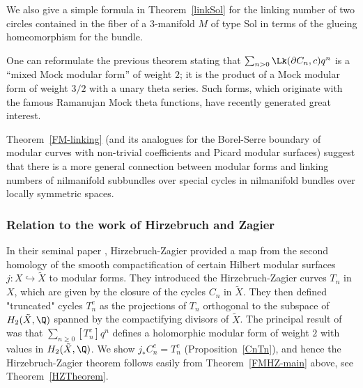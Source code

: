 We also give a simple formula in Theorem~\ref{linkSol} for the
linking number of two circles contained in the fiber of a $3$-manifold
$M$ of type Sol in terms of the glueing homeomorphism for the bundle.

One can reformulate the previous theorem stating that
$\sum_{n>0}\Lk(\partial C_n,c) q^n$ is a ``mixed Mock modular form''
of weight $2$; it is the product of a Mock modular form of weight
$3/2$ with a unary theta series. Such forms, which originate with
the famous Ramanujan Mock theta functions, have recently generated
great interest.

Theorem~\ref{FM-linking} (and its analogues for the Borel-Serre
boundary of modular curves with non-trivial coefficients and Picard
modular surfaces) suggest that there is a more general connection
between modular forms and linking numbers of nilmanifold subbundles
over special cycles in nilmanifold  bundles over locally symmetric
spaces.



\subsubsection*{Relation to the work of Hirzebruch and Zagier}

In their seminal paper \cite{HZ}, Hirzebruch-Zagier provided a map
from the second homology of the smooth compactification of certain
Hilbert modular surfaces $j:X \hookrightarrow \tilde{X}$ to modular
forms. They introduced the Hirzebruch-Zagier curves $T_n$ in $X$,
which are given by the closure of the cycles $C_n$ in $\tilde{X}$.
They then defined "truncated" cycles $T_n^c$ as the
projections of $T_n$ orthogonal to the subspace of $H_2(\tilde{X},\Q)$
spanned by the
compactifying divisors of $\tilde{X}$. The principal result of
\cite{HZ} was that $\sum_{n \geq 0} [T_n^c] q^n$ defines a holomorphic
modular form of weight $2$ with values in $H_2(\tilde{X},\Q)$.
We show $j_{\ast} C_n^c = T_n^c$ (Proposition~\ref{CnTn}), and hence
the Hirzebruch-Zagier theorem follows easily from Theorem~\ref{FMHZ-main}
above, see Theorem~\ref{HZTheorem}.

